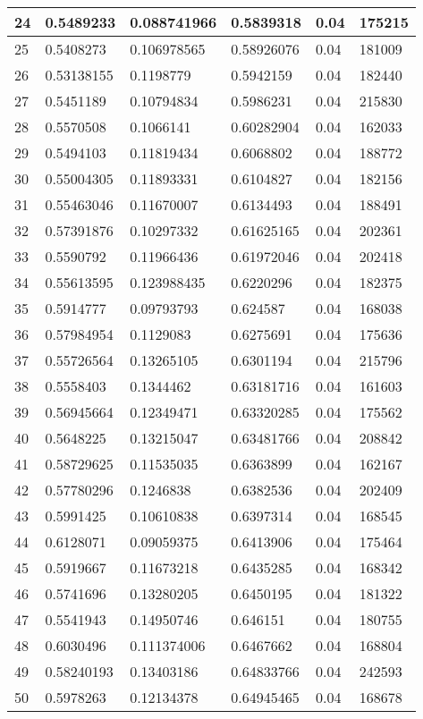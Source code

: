 \begin{longtable}{|l|l|l|l|l|l|}
24 & 0.5489233 & 0.088741966 & 0.5839318 & 0.04 & 175215 \\ \hline 
25 & 0.5408273 & 0.106978565 & 0.58926076 & 0.04 & 181009 \\ \hline 
26 & 0.53138155 & 0.1198779 & 0.5942159 & 0.04 & 182440 \\ \hline 
27 & 0.5451189 & 0.10794834 & 0.5986231 & 0.04 & 215830 \\ \hline 
28 & 0.5570508 & 0.1066141 & 0.60282904 & 0.04 & 162033 \\ \hline 
29 & 0.5494103 & 0.11819434 & 0.6068802 & 0.04 & 188772 \\ \hline 
30 & 0.55004305 & 0.11893331 & 0.6104827 & 0.04 & 182156 \\ \hline 
31 & 0.55463046 & 0.11670007 & 0.6134493 & 0.04 & 188491 \\ \hline 
32 & 0.57391876 & 0.10297332 & 0.61625165 & 0.04 & 202361 \\ \hline 
33 & 0.5590792 & 0.11966436 & 0.61972046 & 0.04 & 202418 \\ \hline 
34 & 0.55613595 & 0.123988435 & 0.6220296 & 0.04 & 182375 \\ \hline 
35 & 0.5914777 & 0.09793793 & 0.624587 & 0.04 & 168038 \\ \hline 
36 & 0.57984954 & 0.1129083 & 0.6275691 & 0.04 & 175636 \\ \hline 
37 & 0.55726564 & 0.13265105 & 0.6301194 & 0.04 & 215796 \\ \hline 
38 & 0.5558403 & 0.1344462 & 0.63181716 & 0.04 & 161603 \\ \hline 
39 & 0.56945664 & 0.12349471 & 0.63320285 & 0.04 & 175562 \\ \hline 
40 & 0.5648225 & 0.13215047 & 0.63481766 & 0.04 & 208842 \\ \hline 
41 & 0.58729625 & 0.11535035 & 0.6363899 & 0.04 & 162167 \\ \hline 
42 & 0.57780296 & 0.1246838 & 0.6382536 & 0.04 & 202409 \\ \hline 
43 & 0.5991425 & 0.10610838 & 0.6397314 & 0.04 & 168545 \\ \hline 
44 & 0.6128071 & 0.09059375 & 0.6413906 & 0.04 & 175464 \\ \hline 
45 & 0.5919667 & 0.11673218 & 0.6435285 & 0.04 & 168342 \\ \hline 
46 & 0.5741696 & 0.13280205 & 0.6450195 & 0.04 & 181322 \\ \hline 
47 & 0.5541943 & 0.14950746 & 0.646151 & 0.04 & 180755 \\ \hline 
48 & 0.6030496 & 0.111374006 & 0.6467662 & 0.04 & 168804 \\ \hline 
49 & 0.58240193 & 0.13403186 & 0.64833766 & 0.04 & 242593 \\ \hline 
50 & 0.5978263 & 0.12134378 & 0.64945465 & 0.04 & 168678 \\ \hline 
\end{longtable}